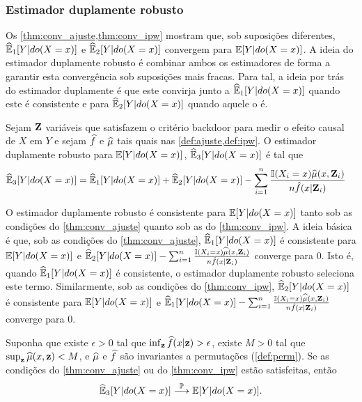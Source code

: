 \subsubsection{Estimador duplamente robusto}

Os \cref{thm:conv_ajuste,thm:conv_ipw} mostram que,
sob suposições diferentes, 
${\widehat{{\mathbb E}}}_{1}[Y|do(X=x)]$ e ${\widehat{{\mathbb E}}}_{2}[Y|do(X=x)]$ convergem para ${\mathbb E}[Y|do(X=x)]$.
A ideia do estimador duplamente robusto é
combinar ambos os estimadores de forma
a garantir esta convergência sob 
suposições mais fracas.
Para tal, a ideia por trás do 
estimador duplamente é que
este convirja junto a ${\widehat{{\mathbb E}}}_{1}[Y|do(X=x)]$ 
quando este é consistente e
para ${\widehat{{\mathbb E}}}_{2}[Y|do(X=x)]$ quando aquele o é.

\begin{definition}
 Sejam ${\mathbf{Z}}$ variáveis que satisfazem o critério backdoor
 para medir o efeito causal de $X$ em $Y$ e 
 sejam $\widehat{f}$ e ${\widehat{\mu}}$ tais quais nas
 \cref{def:ajuste,def:ipw}.
 O estimador duplamente robusto para
 ${\mathbb E}[Y|do(X=x)]$, ${\widehat{{\mathbb E}}}_{3}[Y|do(X=x)]$ é tal que
 \label{def:duplo_robusto}
 \begin{align*}
  {\widehat{{\mathbb E}}}_{3}[Y|do(X=x)] 
  &= {\widehat{{\mathbb E}}}_{1}[Y|do(X=x)] + {\widehat{{\mathbb E}}}_{2}[Y|do(X=x)] 
  - \sum_{i=1}^n \frac{{\mathbb I}(X_i=x){\widehat{\mu}}(x,{\mathbf{Z}}_i)}{n\hat{f}(x|{\mathbf{Z}}_i)}
 \end{align*}
\end{definition}

O estimador duplamente robusto é consistente para
${\mathbb E}[Y|do(X=x)]$ tanto sob as condições do
\cref{thm:conv_ajuste} quanto sob as do
\cref{thm:conv_ipw}. A ideia básica é que,
sob as condições do \cref{thm:conv_ajuste},
${\widehat{{\mathbb E}}}_{1}[Y|do(X=x)]$ é consistente para ${\mathbb E}[Y|do(X=x)]$ e
${\widehat{{\mathbb E}}}_{2}[Y|do(X=x)] - \sum_{i=1}^n \frac{{\mathbb I}(X_i=x){\widehat{\mu}}(x,{\mathbf{Z}}_i)}{n\hat{f}(x|{\mathbf{Z}}_i)}$
converge para $0$. Isto é,
quando ${\widehat{{\mathbb E}}}_{1}[Y|do(X=x)]$ é consistente,
o estimador duplamente robusto seleciona este termo.
Similarmente, sob as condições do \cref{thm:conv_ipw},
${\widehat{{\mathbb E}}}_{2}[Y|do(X=x)]$ é consistente para ${\mathbb E}[Y|do(X=x)]$ e
${\widehat{{\mathbb E}}}_{1}[Y|do(X=x)] - \sum_{i=1}^n \frac{{\mathbb I}(X_i=x){\widehat{\mu}}(x,{\mathbf{Z}}_i)}{n\hat{f}(x|{\mathbf{Z}}_i)}$
converge para $0$.

\begin{theorem}
 \label{thm:conv_duplo_robusto}
 Suponha que existe $\epsilon > 0$ tal que
 $\inf_{\mathbf{z}} \widehat{f}(x|{\mathbf{z}}) > \epsilon$,
 existe $M > 0$ tal que 
 $\sup_{\mathbf{z}} {\widehat{\mu}}(x,{\mathbf{z}}) < M$, e
 ${\widehat{\mu}}$ e $\widehat{f}$ são invariantes 
 a permutações (\cref{def:perm}).
 Se as condições do \cref{thm:conv_ajuste} ou
 do \cref{thm:conv_ipw} estão satisfeitas, então
 \begin{align*}
  {\widehat{{\mathbb E}}}_{3}[Y|do(X=x)] \stackrel{{\mathbb P}}{\longrightarrow} {\mathbb E}[Y|do(X=x)].
 \end{align*}
\end{theorem}

